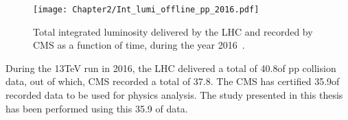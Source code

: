 \begin{figure}[h]
\begin{center}
\texttt{[image: Chapter2/Int\_lumi\_offline\_pp\_2016.pdf]}
\caption{Total integrated luminosity delivered by the LHC and recorded by CMS as a function of time, during the year 2016~\cite{Web:CMSLumi}.}
\label{fig:LHCLumi}
\end{center}
\end{figure}

During the 13\unit{TeV} run in 2016, the LHC delivered a total of 40.8\fbinv of pp collision data, out of which, CMS recorded a total of 37.8\fbinv.
The CMS has certified 35.9\fbinv of recorded data to be used for physics analysis. The study presented in this thesis has been performed using this 35.9\fbinv
of data.



